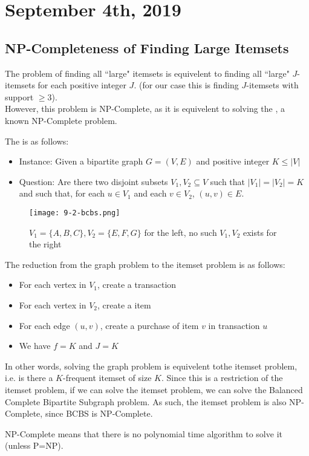 \documentclass[../main/main.tex]{subfiles}
\begin{document}
\section{September 4th, 2019}
\subsection{NP-Completeness of Finding Large Itemsets}
The problem of finding all ``large" itemsets is equivelent to finding all ``large" $J$-itemsets for each positive integer $J$. (for our case this is finding $J$-itemsets with support $\ge 3$).\\

However, this problem is NP-Complete, as it is equivelent to solving the , a known NP-Complete problem.

\begin{definition}
	The  is as follows: 
	\begin{itemize}
		\item Instance: Given a bipartite graph $G=(V,E)$ and positive integer $K\le \left| V \right| $
	\item Question: Are there two disjoint subsets $V_1,V_2\subseteq V$ such that $\left| V_1 \right| =\left| V_2 \right| =K$ and such that, for each $u\in V_1$ and each $v\in V_2$, $(u,v)\in  E$.
	\end{itemize}
\end{definition}
	\begin{figure}[htpb]
		\centering
		\texttt{[image: 9-2-bcbs.png]}
		\caption{$V_1=\{A,B,C\}, V_2=\{E,F,G\} $ for the left, no such $V_1,V_2$ exists for the right}
		\label{fig:}
	\end{figure}
	The reduction from the graph problem to the itemset problem is as follows:
	\begin{itemize}
		\item For each vertex in $V_1$, create a transaction
		\item For each vertex in $V_2$, create a item
		\item For each edge $(u,v)$, create a purchase of item $v$ in transaction $u$
		\item We have $f=K$ and $J=K$
	\end{itemize}
	\begin{remark}
		In other words, solving the graph problem is equivelent tothe itemset problem, i.e. is there a $K$-frequent itemset of size $K$. Since this is a restriction of the itemset problem, if we can solve the itemset problem, we can solve the Balanced Complete Bipartite Subgraph problem. As such, the itemset problem is also NP-Complete, since BCBS is NP-Complete.
	\end{remark}
	\begin{remark}
		NP-Complete means that there is no polynomial time algorithm to solve it (unless P=NP).
	\end{remark}
\end{document}
